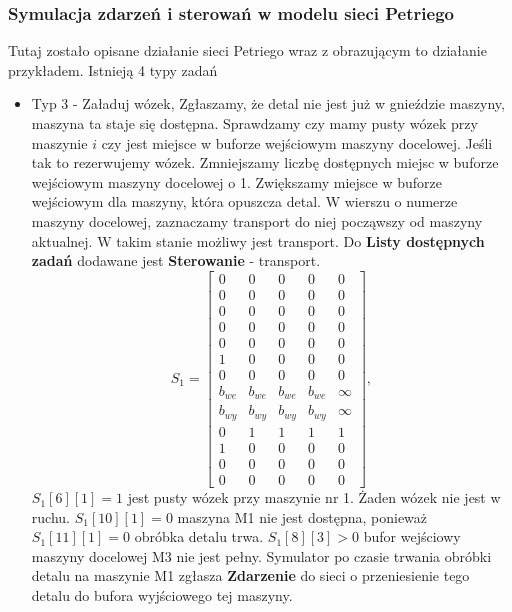 \documentclass[10pt, a4paper]{article}
\begin{document}
\subsubsection{Symulacja zdarzeń i sterowań w modelu sieci Petriego}
\label{funkcje}

Tutaj zostało opisane działanie sieci Petriego wraz z obrazującym to działanie przykładem.
\newline
Istnieją 4 typy zadań
\begin{itemize}

\item Typ 3 - Załaduj wózek,
Zgłaszamy, że detal nie jest już w gnieździe maszyny, maszyna ta staje się dostępna. Sprawdzamy czy mamy pusty wózek przy maszynie $i$ czy jest miejsce w buforze wejściowym maszyny docelowej. Jeśli tak to rezerwujemy wózek. Zmniejszamy liczbę dostępnych miejsc w buforze wejściowym maszyny docelowej o 1. Zwiększamy miejsce w buforze wejściowym dla maszyny, która opuszcza detal. W wierszu o numerze maszyny docelowej, zaznaczamy transport do niej począwszy od maszyny aktualnej. W takim stanie możliwy jest transport. Do \textbf{Listy dostępnych zadań} dodawane jest \textbf{Sterowanie} - transport.
\begin{equation*}
S_1=\left[\begin{array}{ccccc}
0 & 0 & 0 & 0&0\\
0 & 0 & 0 & 0 & 0\\
0 & 0 & 0 & 0& 0\\
0 & 0 & 0 & 0& 0\\
0 & 0 & 0 & 0& 0\\
1 & 0 & 0 & 0 & 0\\
0 & 0 & 0 & 0& 0\\
b_{we}& b_{we}& b_{we}& b_{we} & \infty\\
b_{wy}& b_{wy}& b_{wy}& b_{wy} & \infty\\
0& 1& 1& 1 & 1\\
1 & 0 & 0 & 0 & 0\\
0 & 0 & 0 & 0 & 0\\
0 & 0 & 0 & 0 & 0
\end{array}\right],
\end{equation*}
$S_1[6][1]=1$ jest pusty wózek przy maszynie nr 1. Żaden wózek nie jest w ruchu. $S_1[10][1]=0$ maszyna M1 nie jest dostępna, ponieważ $S_1[11][1]=0$ obróbka detalu trwa. $S_1[8][3]>0$ bufor wejściowy maszyny docelowej M3 nie jest pełny. Symulator po czasie trwania obróbki detalu na maszynie M1 zgłasza \textbf{Zdarzenie} do sieci o przeniesienie tego detalu do bufora wyjściowego tej maszyny.

\end{itemize}
\end{document}

